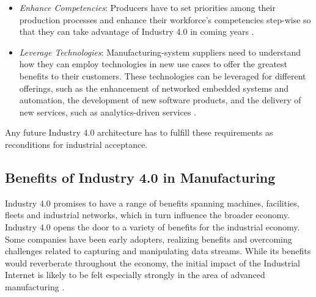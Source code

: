 \begin{itemize}
\item \textit{Enhance Competencies}: Producers have to set priorities among their production processes and enhance their workforce’s competencies step-wise so that they can take advantage of Industry 4.0 in coming years \cite{MANMACHINE}.
\item \textit{Leverage Technologies}: Manufacturing-system suppliers need to understand how they can employ technologies in new use cases to offer the greatest benefits to their customers. These technologies can be leveraged for different offerings, such as the enhancement of networked embedded systems and automation, the development of new software products, and the delivery of new services, such as analytics-driven services \cite{MANMACHINE,INDUSINTERNET}.
\end{itemize}
Any future Industry 4.0 architecture has to fulfill these requirements as reconditions for industrial acceptance.
\subsection{Benefits of Industry 4.0 in Manufacturing}
Industry 4.0 promises to have a range of benefits spanning machines, facilities, fleets and industrial networks, which in turn influence the broader economy. Industry 4.0 opens the door to a variety of benefits for the industrial economy. Some companies have been early adopters, realizing benefits and overcoming challenges related to capturing and manipulating data streams. While its benefits would reverberate throughout the economy, the initial impact of the Industrial Internet is likely to be felt especially strongly in the area of advanced manufacturing \cite{INDUSINTERNET}.

